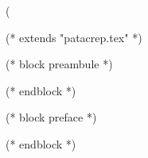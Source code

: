 (%

(* extends "patacrep.tex" *)

(* block preambule *)
\usepackage{licence}
(* endblock *)

(* block preface *)
\newpage

\newpage
(* endblock *)

